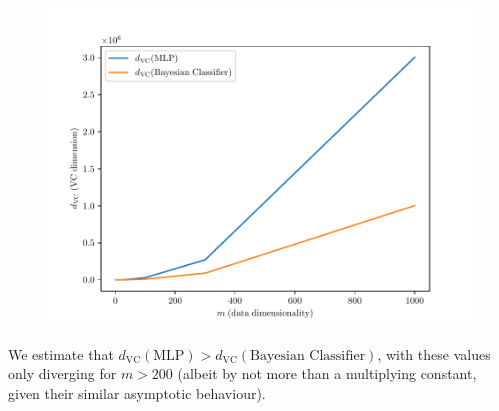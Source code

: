 \documentclass{exam}
\begin{document}
\begin{questions}
\begin{parts}
            \vspace{1em}
            \item \quad 
            \vspace{-3.0em}
            \begin{figure}[H]
                \centering
                \includegraphics[scale = 0.75]{vc_4_b.pdf}
            \end{figure}
            We estimate that $d_{\text{VC}}(\text{MLP}) > d_{\text{VC}}(\text{Bayesian Classifier})$, with these values only diverging for $m > 200$ (albeit by not more than a multiplying constant, given their similar asymptotic behaviour).
        \end{parts}
    \end{questions}
\end{document}
